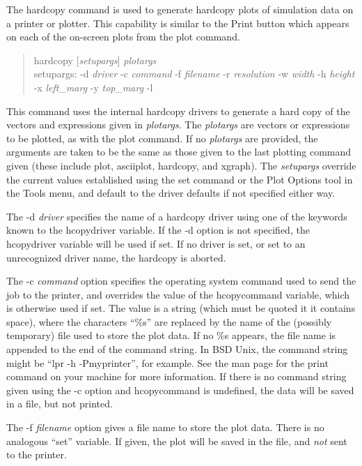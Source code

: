 
The {\cb hardcopy} command is used to generate hardcopy plots of
simulation data on a printer or plotter.  This capability is similar
to the {\cb Print} button which appears on each of the on-screen plots
from the {\cb plot} command.
\begin{quote}\vt
hardcopy [{\it setupargs\/}] {\it plotargs\/}\\
setupargs: -d {\it driver} -c {\it command} -f {\it filename}
 -r {\it resolution} -w {\it width} -h {\it height}\\
 -x {\it left\_marg} -y {\it top\_marg} -l
\end{quote}
This command uses the internal hardcopy drivers to generate a hard
copy of the vectors and expressions given in {\it plotargs}.  The {\it
plotargs} are vectors or expressions to be plotted, as with the {\cb
plot} command.  If no {\it plotargs} are provided, the arguments are
taken to be the same as those given to the last plotting command given
(these include {\cb plot}, {\cb asciiplot}, {\cb hardcopy}, and {\cb
xgraph}).  The {\it setupargs} override the current values established
using the {\cb set} command or the {\cb Plot Options} tool in the {\cb
Tools} menu, and default to the driver defaults if not specified
either way.

The {\vt -d} {\it driver} specifies the name of a hardcopy driver
using one of the keywords known to the {\et hcopydriver} variable.  If
the {\vt -d} option is not specified, the {\et hcopydriver} variable
will be used if set.  If no driver is set, or set to an unrecognized
driver name, the hardcopy is aborted.

The {\vt -c} {\it command} option specifies the operating system
command used to send the job to the printer, and overrides the value
of the {\et hcopycommand} variable, which is otherwise used if set. 
The value is a string (which must be quoted it it contains space),
where the characters ``{\vt \%s}'' are replaced by the name of the
(possibly temporary) file used to store the plot data.  If no {\vt
\%s} appears, the file name is appended to the end of the command
string.  In BSD Unix, the command string might be ``{\vt lpr -h
-Pmyprinter}'', for example.  See the man page for the print command
on your machine for more information.  If there is no command string
given using the {\vt -c} option and {\et hcopycommand} is undefined,
the data will be saved in a file, but not printed.

The {\vt -f} {\it filename} option gives a file name to store the plot
data.  There is no analogous ``set'' variable.  If given, the plot
will be saved in the file, and {\it not} sent to the printer.

